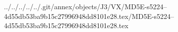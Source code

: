 ../../../../../.git/annex/objects/J3/VX/MD5E-s5224--4d55db53ba9b15c27996948dd8101e28.tex/MD5E-s5224--4d55db53ba9b15c27996948dd8101e28.tex